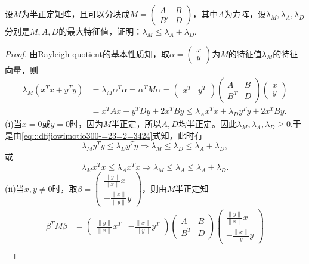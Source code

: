\documentclass[../../main.tex]{subfiles}
\begin{document}
\begin{example}
设$M$为半正定矩阵，且可以分块成$M=\begin{pmatrix} A & B \\ B' & D \end{pmatrix}$，其中$A$为方阵，设$\lambda_M,\lambda_A,\lambda_D$分别是$M,A,D$的最大特征值，证明：$\lambda_M \leqslant \lambda_A + \lambda_D$.
\end{example}
\begin{proof}
由\hyperref[proposition:Rayleigh-quotient瑞丽商的基本性质]{Rayleigh-quotient的基本性质}知，取$\alpha =\begin{pmatrix} x \\ y \end{pmatrix}$为$M$的特征值$\lambda_M$的特征向量，则
\begin{align}
\lambda_M (x^T x + y^T y) &= \lambda_M \alpha^T \alpha = \alpha^T M \alpha = \begin{pmatrix} x^T & y^T \end{pmatrix} \begin{pmatrix} A & B \\ B^T & D \end{pmatrix} \begin{pmatrix} x \\ y \end{pmatrix} \nonumber \\
&= x^T A x + y^T D y + 2x^T B y \leqslant \lambda_A x^T x + \lambda_D y^T y + 2x^T B y. \label{eq:::dfijiowimotio300-=23=2=3424}
\end{align}
(i)当$x=0$或$y=0$时，因为$M$半正定，所以$A,D$均半正定。因此$\lambda_M,\lambda_A,\lambda_D\geqslant 0$.于是由\eqref{eq:::dfijiowimotio300-=23=2=3424}式知，此时有
$$\lambda_M y^T y \leqslant \lambda_D y^T y \Longrightarrow \lambda_M \leqslant \lambda_D \leqslant \lambda_A + \lambda_D,$$
或
$$\lambda_M x^T x \leqslant \lambda_A x^T x \Longrightarrow \lambda_M \leqslant \lambda_A \leqslant \lambda_A + \lambda_D.$$
(ii)当$x,y \neq 0$时，取$\beta = \begin{pmatrix} \frac{\| y \|}{\| x \|}x \\ -\frac{\| x \|}{\| y \|}y \end{pmatrix}$，则由$M$半正定知
\begin{align*}
\beta^T M \beta &= \begin{pmatrix} \frac{\| y \|}{\| x \|}x^T & -\frac{\| x \|}{\| y \|}y^T \end{pmatrix} \begin{pmatrix} A & B \\ B^T & D \end{pmatrix} \begin{pmatrix} \frac{\| y \|}{\| x \|}x \\ -\frac{\| x \|}{\| y \|}y \end{pmatrix} \\

\end{align*}
\end{proof}
\end{document}
